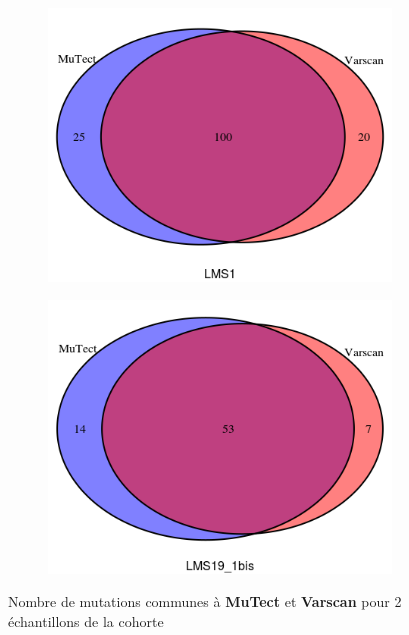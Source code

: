 \begin{figure}[h]
\centering
\begin{subfigure}{0.3\textwidth}
\centering
\includegraphics[scale=0.6]{Figures/LMS1.png}
\end{subfigure} 
\hspace{2.5cm}
{\vrule height 3cm width 0.1mm} 
\hspace{1cm}
\begin{subfigure}{0.4\textwidth}
\centering
\includegraphics[scale=0.6]{Figures/LMS19_1bis.png}
\end{subfigure}
\captionsetup{justification=centering}
\caption{Nombre de mutations communes à \textbf{MuTect} et \textbf{Varscan} pour 2 échantillons de la cohorte}
\label{fig:venn}
\end{figure}

